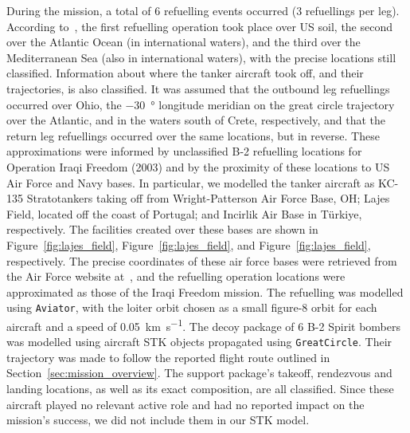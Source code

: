 \documentclass{article}
\begin{document}
During the mission, a total of 6 refuelling events occurred (3 refuellings per leg). According to~\cite{lemay2025midnight}, the first refuelling operation took place over US soil, the second over the Atlantic Ocean (in international waters), and the third over the Mediterranean Sea (also in international waters), with the precise locations still classified. Information about where the tanker aircraft took off, and their trajectories, is also classified. It was assumed that the outbound leg refuellings occurred over Ohio, the \SI{-30}{\degree} longitude meridian on the great circle trajectory over the Atlantic, and in the waters south of Crete, respectively, and that the return leg refuellings occurred over the same locations, but in reverse. These approximations were informed by unclassified B-2 refuelling locations for Operation Iraqi Freedom (2003) and by the proximity of these locations to US Air Force and Navy bases. In particular, we modelled the tanker aircraft as KC-135 Stratotankers taking off from Wright-Patterson Air Force Base, OH; Lajes Field, located off the coast of Portugal; and Incirlik Air Base in Türkiye, respectively. The facilities created over these bases are shown in Figure~\ref{fig:lajes_field}, Figure~\ref{fig:lajes_field}, and Figure~\ref{fig:lajes_field}, respectively. The precise coordinates of these air force bases were retrieved from the Air Force website at~\cite{ingram_basemap}, and the refuelling operation locations were approximated as those of the Iraqi Freedom mission. The refuelling was modelled using \texttt{Aviator}, with the loiter orbit chosen as a small figure-8 orbit for each aircraft and a speed of \SI{0.05}{\kilo\metre\per\second}. The decoy package of 6 B-2 Spirit bombers was modelled using aircraft STK objects propagated using \texttt{GreatCircle}. Their trajectory was made to follow the reported flight route outlined in Section~\ref{sec:mission_overview}. The support package's takeoff, rendezvous and landing locations, as well as its exact composition, are all classified. Since these aircraft played no relevant active role and had no reported impact on the mission's success, we did not include them in our STK model.
\end{document}
